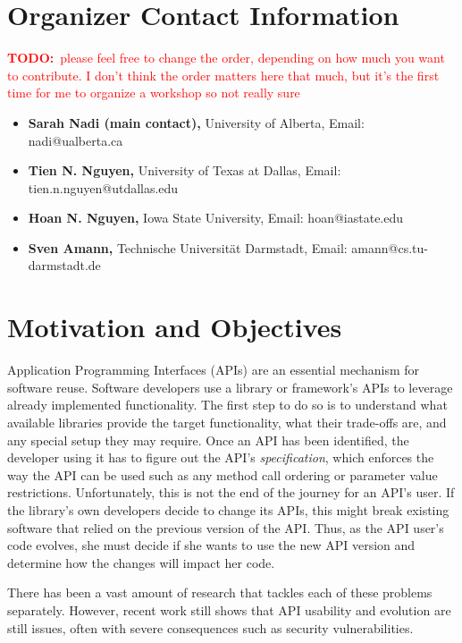 \documentclass[10pt, conference]{IEEEtran}
\newcommand{\todo}[1]{{\textcolor{red}{\textbf{TODO:}~#1}}}
\begin{document}
\section{Organizer Contact Information}
\todo{please feel free to change the order, depending on how much you want to contribute. I don't think the order matters here that much, but it's the first time for me to organize a workshop so not really sure}
\begin{itemize}
\item \textbf{Sarah Nadi (main contact),} University of Alberta, Email: nadi@ualberta.ca
\item \textbf{Tien N. Nguyen,} University of Texas at Dallas, Email: tien.n.nguyen@utdallas.edu
\item \textbf{Hoan N. Nguyen,} Iowa State University, Email: hoan@iastate.edu
\item \textbf{Sven Amann,} Technische Universit\"{a}t Darmstadt, Email: amann@cs.tu-darmstadt.de
\end{itemize}

\section{Motivation and Objectives}
Application Programming Interfaces (APIs) are an essential mechanism for software reuse. Software developers use a library or framework's APIs to leverage already implemented functionality. The first step to do so is to understand what available libraries provide the target functionality, what their trade-offs are, and any special setup they may require. Once an API has been identified, the developer using it has to figure out the API's \textit{specification}, which enforces the way the API can be used such as any method call ordering or parameter value restrictions. Unfortunately, this is not the end of the journey for an API's user. If the library's own developers decide to change its APIs, this might break existing software that relied on the previous version of the API. Thus, as the API user's code evolves, she must decide if she wants to use the new API version and determine how the changes will impact her code.

There has been a vast amount of research that tackles each of these problems separately. However, recent work still shows that API usability and evolution are still issues, often with severe consequences such as security vulnerabilities. 
\end{document}
